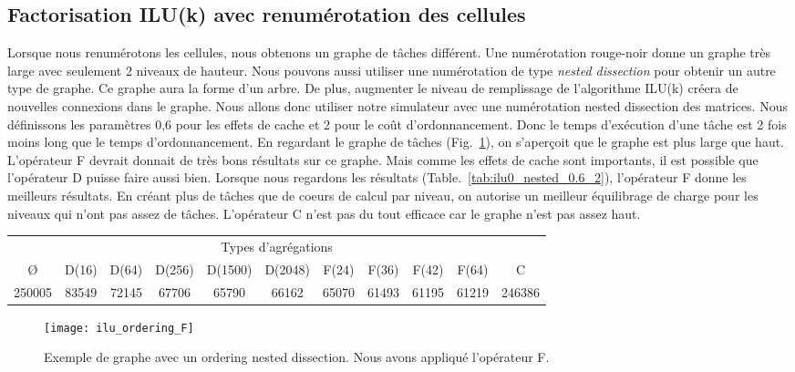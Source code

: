 \subsection{Factorisation ILU(k) avec renumérotation des cellules}
Lorsque nous renumérotons les cellules, nous obtenons un graphe de tâches différent.
%
Une numérotation rouge-noir donne un graphe très large avec seulement 2 niveaux de hauteur.
%
Nous pouvons aussi utiliser une numérotation de type {\em nested dissection} pour obtenir un autre type de graphe.
%
Ce graphe aura la forme d'un arbre.
%
De plus, augmenter le niveau de remplissage de l'algorithme ILU(k) créera de nouvelles connexions dans le graphe.
%
Nous allons donc utiliser notre simulateur avec une numérotation nested dissection des matrices.
%
Nous définissons les paramètres 0,6 pour les effets de cache et 2 pour le coût d'ordonnancement.
%
Donc le temps d'exécution d'une tâche est 2 fois moins long que le temps d'ordonnancement.
%
En regardant le graphe de tâches (Fig.~\ref{fig:ilu_ordering_F}), on s'aperçoit que le graphe est plus large que haut.
%
L'opérateur F devrait donnait de très bons résultats sur ce graphe.
%
Mais comme les effets de cache sont importants, il est possible que l'opérateur D puisse faire aussi bien.
%
Lorsque nous regardons les résultats (Table.~\ref{tab:ilu0_nested_0.6_2}), l'opérateur F donne les meilleurs résultats.
%
En créant plus de tâches que de coeurs de calcul par niveau, on autorise un meilleur équilibrage de charge pour les niveaux qui n'ont pas assez de tâches.
%
L'opérateur C n'est pas du tout efficace car le graphe n'est pas assez haut.


\begin{center}
  \begin{tabular}{|c|c|c|c|c|c|c|c|c|c|c|}
    \hline
    \multicolumn{11}{|c|}{Types d'agrégations}\\
    \O & D(16) & D(64) & D(256) & D(1500) & D(2048) & F(24) & F(36) & F(42) & F(64) & C \\
    \hline
    250005 & 83549 & 72145 & 67706 & 65790 & 66162 & 65070 & 61493 & 61195 & 61219 & 246386 \\
    \hline
  \end{tabular}
  \label{tab:ilu0_nested_0.6_2}
\end{center}


\begin{figure}[t!]
  \centering
  \texttt{[image: ilu\_ordering\_F]}
  \caption{Exemple de graphe avec un ordering nested dissection. Nous avons appliqué l'opérateur F.}
  \label{fig:ilu_ordering_F}
\end{figure}


